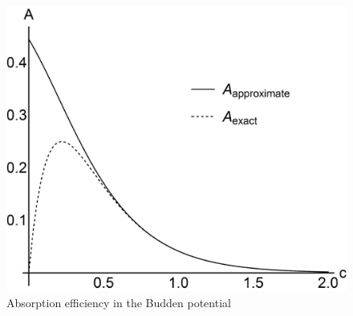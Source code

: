 \documentclass[asy]{iosart2x}
\begin{document}
\begin{figure}
\centering
\noindent
\includegraphics[width=\textwidth]{absorp.jpg}
\caption{Absorption efficiency in the Budden potential}
\label{fig:absorp}
\end{figure} 
\end{document}
